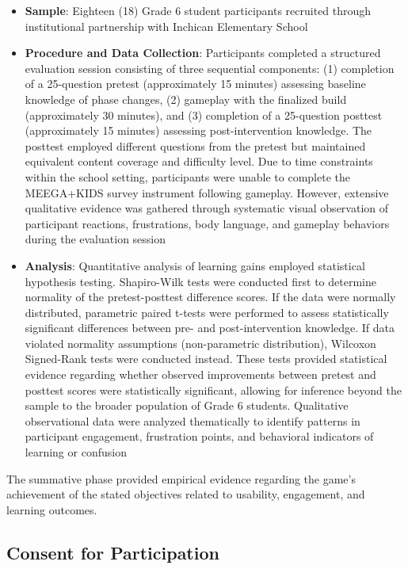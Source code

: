 \begin{itemize}
    \item \textbf{Sample}: Eighteen (18) Grade 6 student participants recruited through institutional partnership with Inchican Elementary School
    
    \item \textbf{Procedure and Data Collection}: Participants completed a structured evaluation session consisting of three sequential components: (1) completion of a 25-question pretest (approximately 15 minutes) assessing baseline knowledge of phase changes, (2) gameplay with the finalized build (approximately 30 minutes), and (3) completion of a 25-question posttest (approximately 15 minutes) assessing post-intervention knowledge. The posttest employed different questions from the pretest but maintained equivalent content coverage and difficulty level. Due to time constraints within the school setting, participants were unable to complete the MEEGA+KIDS survey instrument following gameplay. However, extensive qualitative evidence was gathered through systematic visual observation of participant reactions, frustrations, body language, and gameplay behaviors during the evaluation session
    
    \item \textbf{Analysis}: Quantitative analysis of learning gains employed statistical hypothesis testing. Shapiro-Wilk tests were conducted first to determine normality of the pretest-posttest difference scores. If the data were normally distributed, parametric paired t-tests were performed to assess statistically significant differences between pre- and post-intervention knowledge. If data violated normality assumptions (non-parametric distribution), Wilcoxon Signed-Rank tests were conducted instead. These tests provided statistical evidence regarding whether observed improvements between pretest and posttest scores were statistically significant, allowing for inference beyond the sample to the broader population of Grade 6 students. Qualitative observational data were analyzed thematically to identify patterns in participant engagement, frustration points, and behavioral indicators of learning or confusion
\end{itemize}

The summative phase provided empirical evidence regarding the game's achievement of the stated objectives related to usability, engagement, and learning outcomes.

\subsection{Consent for Participation}

